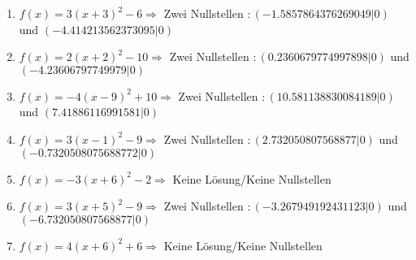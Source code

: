 \documentclass{article}%
\begin{document}
\begin{enumerate}[label=\alph*)]
\item%
\newline\vspace{0.5cm}$f(x)=3(x+3)^2 -6 \Rightarrow $ Zwei Nullstellen $: (-1.5857864376269049|0) $ und $ (-4.414213562373095|0) $%
\item%
\newline\vspace{0.5cm}$f(x)=2(x+2)^2 -10 \Rightarrow $ Zwei Nullstellen $: (0.2360679774997898|0) $ und $ (-4.23606797749979|0) $%
\item%
\newline\vspace{0.5cm}$f(x)=-4(x-9)^2 +10 \Rightarrow $ Zwei Nullstellen $: (10.581138830084189|0) $ und $ (7.41886116991581|0) $%
\item%
\newline\vspace{0.5cm}$f(x)=3(x-1)^2 -9 \Rightarrow $ Zwei Nullstellen $: (2.732050807568877|0) $ und $ (-0.7320508075688772|0) $%
\item%
\newline\vspace{0.5cm}$f(x)=-3(x+6)^2 -2 \Rightarrow  $ Keine Lösung/Keine Nullstellen $ $%
\item%
\newline\vspace{0.5cm}$f(x)=3(x+5)^2 -9 \Rightarrow $ Zwei Nullstellen $: (-3.267949192431123|0) $ und $ (-6.732050807568877|0) $%
\item%
\newline\vspace{0.5cm}$f(x)=4(x+6)^2 +6 \Rightarrow  $ Keine Lösung/Keine Nullstellen $ $%
\end{enumerate}

%
\end{document}
